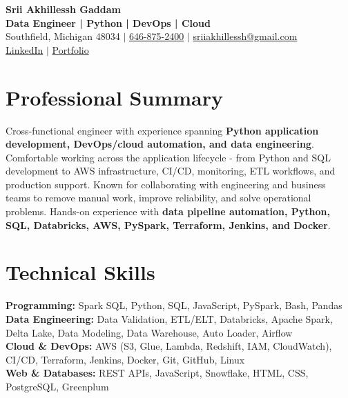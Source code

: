 \documentclass[letterpaper,10pt]{article}
\begin{document}
\fontsize{9.35pt}{10.45pt}\selectfont

\begin{center}
    {\LARGE \textbf{Srii Akhillessh Gaddam}} \\[-1pt]
    \textbf{Data Engineer | Python | DevOps | Cloud} \\[2pt]
    Southfield, Michigan 48034 $|$
    \href{tel:6468752400}{646-875-2400} $|$
    \href{mailto:sriiakhillessh@gmail.com}{sriiakhillessh@gmail.com} \\[1pt]
    \href{https://www.linkedin.com/in/srii-akhiilessh-gaddam-b48668191/}{LinkedIn} $|$
    \href{https://sriiakhillesshg.github.io/portfolio/}{Portfolio}
\end{center}
\vspace{-8pt}

\section{Professional Summary}
\small{Cross-functional engineer with experience spanning \textbf{Python application development, DevOps/cloud automation, and data engineering}. Comfortable working across the application lifecycle - from Python and SQL development to AWS infrastructure, CI/CD, monitoring, ETL workflows, and production support. Known for collaborating with engineering and business teams to remove manual work, improve reliability, and solve operational problems. Hands-on experience with \textbf{data pipeline automation, Python, SQL, Databricks, AWS, PySpark, Terraform, Jenkins, and Docker}.}

\section{Technical Skills}
\small{
\textbf{Programming:} Spark SQL, Python, SQL, JavaScript, PySpark, Bash, Pandas \\
\textbf{Data Engineering:} Data Validation, ETL/ELT, Databricks, Apache Spark, Delta Lake, Data Modeling, Data Warehouse, Auto Loader, Airflow \\
\textbf{Cloud \& DevOps:} AWS (S3, Glue, Lambda, Redshift, IAM, CloudWatch), CI/CD, Terraform, Jenkins, Docker, Git, GitHub, Linux \\
\textbf{Web \& Databases:} REST APIs, JavaScript, Snowflake, HTML, CSS, PostgreSQL, Greenplum
}
\end{document}

